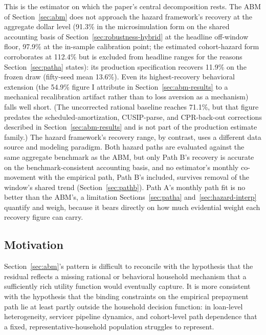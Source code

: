 \documentclass[12pt]{article}
\begin{document}
This is the estimator on which the paper's central decomposition rests. The ABM of Section~\ref{sec:abm} does not approach the hazard framework's recovery at the aggregate dollar level (91.3\% in the microsimulation form on the shared accounting basis of Section~\ref{sec:robustness-hybrid} at the headline off-window floor, 97.9\% at the in-sample calibration point; the estimated cohort-hazard form corroborates at 112.4\% but is excluded from headline ranges for the reasons Section~\ref{sec:patha} states): its production specification recovers 11.9\% on the frozen draw (fifty-seed mean 13.6\%). Even its highest-recovery behavioral extension (the 54.9\% figure I attribute in Section~\ref{sec:abm-results} to a mechanical recalibration artifact rather than to loss aversion as a mechanism) falls well short. (The uncorrected rational baseline reaches 71.1\%, but that figure predates the scheduled-amortization, CUSIP-parse, and CPR-back-out corrections described in Section~\ref{sec:abm-results} and is not part of the production estimate family.) The hazard framework's recovery range, by contrast, uses a different data source and modeling paradigm. Both hazard paths are evaluated against the same aggregate benchmark as the ABM, but only Path B's recovery is accurate on the benchmark-consistent accounting basis, and no estimator's monthly co-movement with the empirical path, Path B's included, survives removal of the window's shared trend (Section~\ref{sec:pathb}). Path A's monthly path fit is no better than the ABM's, a limitation Sections~\ref{sec:patha} and~\ref{sec:hazard-interp} quantify and weigh, because it bears directly on how much evidential weight each recovery figure can carry.

\subsection{Motivation}\label{sec:hazard-motivation}

Section~\ref{sec:abm}'s pattern is difficult to reconcile with the hypothesis that the residual reflects a missing rational or behavioral household mechanism that a sufficiently rich utility function would eventually capture. It is more consistent with the hypothesis that the binding constraints on the empirical prepayment path lie at least partly outside the household decision function: in loan-level heterogeneity, servicer pipeline dynamics, and cohort-level path dependence that a fixed, representative-household population struggles to represent.
\end{document}
